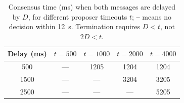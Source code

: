 \begin{table}[htbp]
\centering
\small
\begin{tabular}{c|c|c|c|c}
\hline
Delay (ms) & $t=500$ & $t=1000$ & $t=2000$ & $t=4000$ \\
\hline
500 & --- & 1205 & 1204 & 1204 \\
1500 & --- & --- & 3204 & 3205 \\
2500 & --- & --- & --- & 5205 \\
\hline
\end{tabular}
\caption{Consensus time (ms) when both messages are delayed by $D$, for different proposer timeouts $t$; \texttt{---} means no decision within 12~s. Termination requires $D<t$, not $2D<t$.}
\label{tab:timeout}
\end{table}
